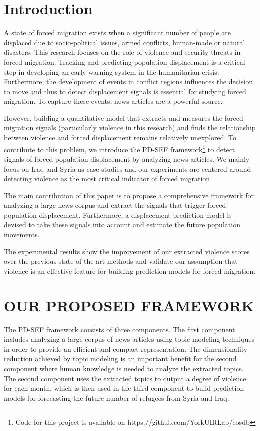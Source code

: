 \section{Introduction}
A state of forced migration exists when a significant number of people are displaced due to socio-political issues, armed conflicts, human-made or natural disasters. This research focuses on the role of violence and security threats in forced migration. Tracking and predicting population displacement is a critical step in developing an early warning system in the humanitarian crisis. Furthermore, the development of events in conflict regions influences the decision to move and thus to detect displacement signals is essential for studying forced migration. To capture these events, news articles are a powerful source.

However, building a quantitative model that extracts and measures the forced migration signals (particularly violence in this research) and finds the relationship between violence and forced displacement remains relatively unexplored. To contribute to this problem, we introduce the PD-SEF framework\footnote{Code for this project is available on https://github.com/YorkUIRLab/eosdb} to detect signals of forced population displacement by analyzing news articles. We mainly focus on Iraq and Syria as case studies and our experiments are centered around detecting violence as the most critical indicator of forced migration. 

The main contribution of this paper is to propose a comprehensive framework for analyzing a large news corpus and extract the signals that trigger forced population displacement. Furthermore, a displacement prediction model is devised to take these signals into account and estimate the future population movements. 

The experimental results show the improvement of our extracted violence scores over the previous state-of-the-art methods and validate our assumption that violence is an effective feature for building prediction models for forced migration. 



\section{OUR PROPOSED FRAMEWORK}
The PD-SEF framework consists of three components. The first component includes analyzing a large corpus of news articles using topic modeling techniques in order to provide an efficient and compact representation. The dimensionality reduction achieved by topic modeling is an important benefit for the second component where human knowledge is needed to analyze the extracted topics. The second component uses the extracted topics to output a degree of violence for each month, which is then used in the third component to build prediction models for forecasting the future number of refugees from Syria and Iraq.


